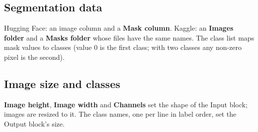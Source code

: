 \documentclass[11pt,a4paper]{article}
\newcommand{\ui}[1]{\textbf{\textsf{#1}}}
\begin{document}
\subsection{Segmentation data}
Hugging Face: an image column and a \ui{Mask column}. Kaggle: an \ui{Images folder} and a \ui{Masks folder} whose files have the same
names. The class list maps mask values to classes (value 0 is the first class; with two classes any non-zero pixel is the second).

\subsection{Image size and classes}
\ui{Image height}, \ui{Image width} and \ui{Channels} set the shape of the Input block; images are resized to it. The class names, one per
line in label order, set the Output block's size.
\end{document}
